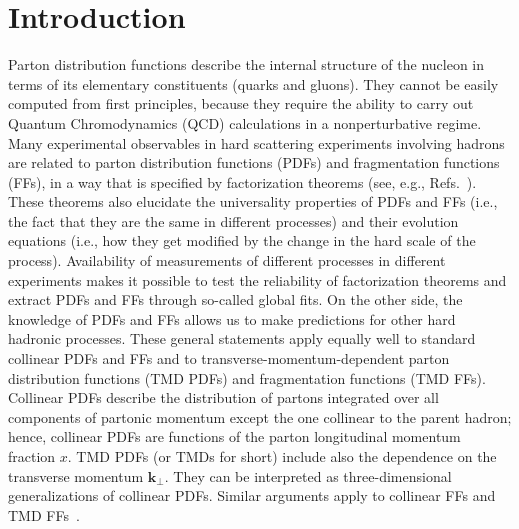 \documentclass[aps,preprintnumbers,showpacs,nofootinbib,superscriptaddress,floatfix]{revtex4}
\newcommand{\T}{\perp}
\begin{document}

\maketitle
\tableofcontents

\newpage
\section{Introduction}
\label{s:intro}

Parton distribution functions describe the internal structure of the nucleon
in terms of its elementary constituents (quarks and gluons). They cannot be
easily computed from first principles, because they require the ability to
carry out Quantum Chromodynamics (QCD) calculations in a nonperturbative
regime. Many experimental observables in hard scattering experiments
involving hadrons are related to parton distribution functions (PDFs) and
fragmentation functions (FFs), in a way that is specified by factorization
theorems (see, e.g., Refs.~\cite{Collins:1989gx,Collins:2011zzd}). 
These theorems also elucidate the universality properties of PDFs and FFs
(i.e., the fact that they are the same in different processes) 
and their evolution equations (i.e., how they get modified by the change in
the hard scale of the process). 
Availability of measurements of different processes in different
experiments makes it possible to test the reliability of factorization
theorems and extract PDFs and FFs through so-called global fits. 
On the other side, the knowledge of PDFs and FFs allows us
to make predictions for other hard hadronic processes. 
These general statements apply equally well to
standard collinear PDFs and FFs and to transverse-momentum-dependent parton
distribution functions (TMD PDFs) and fragmentation functions (TMD FFs). 
Collinear PDFs
describe the distribution of partons integrated over all components of
partonic momentum except the one collinear to the parent hadron; hence,
collinear PDFs
are functions of the parton longitudinal momentum fraction $x$. 
TMD PDFs (or TMDs for short) 
include also the dependence on the transverse momentum $\bm{k}_{\T}$. 
They can be interpreted as three-dimensional generalizations of collinear PDFs.
Similar arguments apply to collinear FFs and TMD
FFs~\cite{Angeles-Martinez:2015sea}. 
\end{document}
